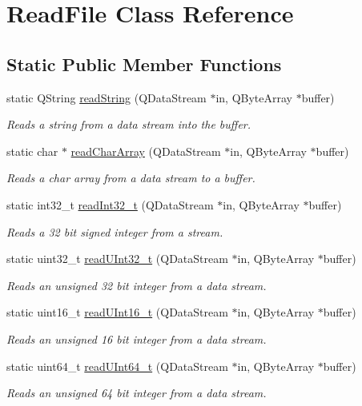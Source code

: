 \hypertarget{class_read_file}{}\section{Read\+File Class Reference}
\label{class_read_file}
\subsection*{Static Public Member Functions}
\begin{DoxyCompactItemize}
\item 
static Q\+String \hyperlink{class_read_file_a155af28990d8464aa556663462ec7e83}{read\+String} (Q\+Data\+Stream $\ast$in, Q\+Byte\+Array $\ast$buffer)
\begin{DoxyCompactList}\small\item\em Reads a string from a data stream into the buffer. \end{DoxyCompactList}\item 
static char $\ast$ \hyperlink{class_read_file_ad05ef7a8f8d53305d5b58facc1c7db94}{read\+Char\+Array} (Q\+Data\+Stream $\ast$in, Q\+Byte\+Array $\ast$buffer)
\begin{DoxyCompactList}\small\item\em Reads a char array from a data stream to a buffer. \end{DoxyCompactList}\item 
static int32\+\_\+t \hyperlink{class_read_file_ab52dc8b21cd580816a9d6c8b2d3b0c49}{read\+Int32\+\_\+t} (Q\+Data\+Stream $\ast$in, Q\+Byte\+Array $\ast$buffer)
\begin{DoxyCompactList}\small\item\em Reads a 32 bit signed integer from a stream. \end{DoxyCompactList}\item 
static uint32\+\_\+t \hyperlink{class_read_file_a8d257e619fcfde95b9a4575985302fb5}{read\+U\+Int32\+\_\+t} (Q\+Data\+Stream $\ast$in, Q\+Byte\+Array $\ast$buffer)
\begin{DoxyCompactList}\small\item\em Reads an unsigned 32 bit integer from a data stream. \end{DoxyCompactList}\item 
static uint16\+\_\+t \hyperlink{class_read_file_ae4d7e714efdb949d33a418819c32470f}{read\+U\+Int16\+\_\+t} (Q\+Data\+Stream $\ast$in, Q\+Byte\+Array $\ast$buffer)
\begin{DoxyCompactList}\small\item\em Reads an unsigned 16 bit integer from a data stream. \end{DoxyCompactList}\item 
static uint64\+\_\+t \hyperlink{class_read_file_a169f01731ca710d2ea946bb92e1ce176}{read\+U\+Int64\+\_\+t} (Q\+Data\+Stream $\ast$in, Q\+Byte\+Array $\ast$buffer)
\begin{DoxyCompactList}\small\item\em Reads an unsigned 64 bit integer from a data stream. \end{DoxyCompactList}\end{DoxyCompactItemize}
